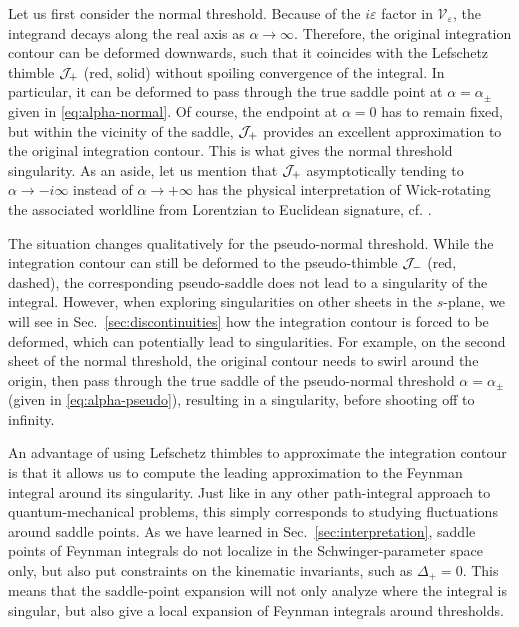 \documentclass[12pt]{article}
\numberwithin{figure}{section}
\def \eps {\varepsilon}
\def \V {\mathcal{V}}
\begin{document}
	Let us first consider the normal threshold. Because of the $i\eps$ factor in $\V_\eps$, the integrand decays along the real axis as $\alpha \to \infty$. Therefore, the original integration contour can be deformed downwards, such that it coincides with the Lefschetz thimble ${\cal J}_+$ (red, solid) without spoiling convergence of the integral. In particular, it can be deformed to pass through the true saddle point at $\alpha = \alpha_\pm$ given in \eqref{eq:alpha-normal}. Of course, the endpoint at $\alpha=0$ has to remain fixed, but within the vicinity of the saddle, ${\cal J}_+$ provides an excellent approximation to the original integration contour. This is what gives the normal threshold singularity. As an aside, let us mention that ${\cal J}_{+}$ asymptotically tending to $\alpha \to -i\infty$ instead of $\alpha \to +\infty$ has the physical interpretation of Wick-rotating the associated worldline from Lorentzian to Euclidean signature, cf. \cite{Witten:2013pra}.
	
	The situation changes qualitatively for the pseudo-normal threshold. While the integration contour can still be deformed to the pseudo-thimble ${\cal J}_-$ (red, dashed), 
	the corresponding pseudo-saddle does not lead to a singularity of the integral.
	However, when exploring singularities on other sheets in the $s$-plane, we will see 
	in Sec.~\ref{sec:discontinuities} how the integration contour is forced to be deformed, which can potentially lead to singularities. For example, on the second sheet of the normal threshold, the original contour needs to swirl around the origin, then pass through the true saddle of the pseudo-normal threshold $\alpha = \alpha_\pm$ (given in \eqref{eq:alpha-pseudo}), resulting in a singularity, before shooting off to infinity.
	
	An advantage of
	using Lefschetz thimbles to approximate the integration contour
	is that it allows us to compute the leading approximation to the Feynman integral around its singularity. Just like in any other path-integral approach to quantum-mechanical problems, this simply corresponds to
	studying fluctuations around saddle points. As we have learned in Sec.~\ref{sec:interpretation},
	saddle points of Feynman integrals do not localize in the Schwinger-parameter space only, but also put constraints on the kinematic invariants, such as $\Delta_+ = 0$. This means that the saddle-point expansion will not only analyze where the integral is singular, but also give a local expansion of Feynman integrals around thresholds.
	
\end{document}
